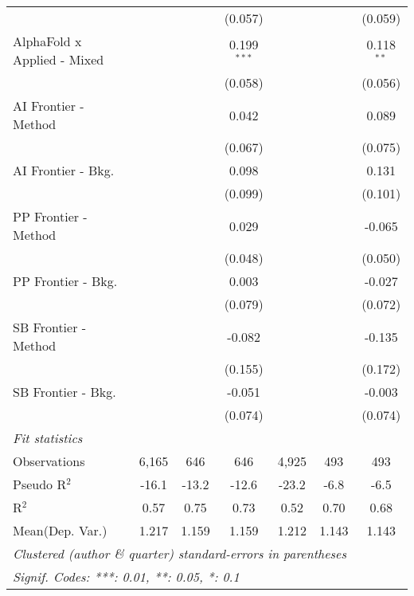 \begin{tabular}{lcccccc}
                               &         &               & (0.057)       &         &              & (0.059)\\   
   AlphaFold x Applied - Mixed &         &               & 0.199$^{***}$ &         &              & 0.118$^{**}$\\   
                               &         &               & (0.058)       &         &              & (0.056)\\   
   AI Frontier - Method        &         &               & 0.042         &         &              & 0.089\\   
                               &         &               & (0.067)       &         &              & (0.075)\\   
   AI Frontier - Bkg.          &         &               & 0.098         &         &              & 0.131\\   
                               &         &               & (0.099)       &         &              & (0.101)\\   
   PP Frontier - Method        &         &               & 0.029         &         &              & -0.065\\   
                               &         &               & (0.048)       &         &              & (0.050)\\   
   PP Frontier - Bkg.          &         &               & 0.003         &         &              & -0.027\\   
                               &         &               & (0.079)       &         &              & (0.072)\\   
   SB Frontier - Method        &         &               & -0.082        &         &              & -0.135\\   
                               &         &               & (0.155)       &         &              & (0.172)\\   
   SB Frontier - Bkg.          &         &               & -0.051        &         &              & -0.003\\   
                               &         &               & (0.074)       &         &              & (0.074)\\   
   \midrule
   \emph{Fit statistics}\\
   Observations                & 6,165   & 646           & 646           & 4,925   & 493          & 493\\  
   Pseudo R$^2$                & -16.1   & -13.2         & -12.6         & -23.2   & -6.8         & -6.5\\  
   R$^2$                       & 0.57    & 0.75          & 0.73          & 0.52    & 0.70         & 0.68\\  
Mean(Dep. Var.) & 1.217 & 1.159 & 1.159 & 1.212 & 1.143 & 1.143 \\
   \midrule \midrule
   \multicolumn{7}{l}{\emph{Clustered (author \& quarter) standard-errors in parentheses}}\\
   \multicolumn{7}{l}{\emph{Signif. Codes: ***: 0.01, **: 0.05, *: 0.1}}\\
\end{tabular}
\par\endgroup
